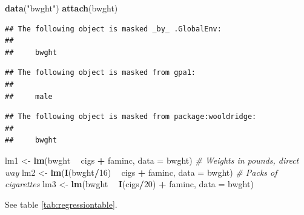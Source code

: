 \documentclass[]{book}
\newenvironment{Shaded}{\begin{snugshade}}{\end{snugshade}}
\newcommand{\CommentTok}[1]{\textcolor[rgb]{0.56,0.35,0.01}{\textit{#1}}}
\newcommand{\DataTypeTok}[1]{\textcolor[rgb]{0.13,0.29,0.53}{#1}}
\newcommand{\DecValTok}[1]{\textcolor[rgb]{0.00,0.00,0.81}{#1}}
\newcommand{\KeywordTok}[1]{\textcolor[rgb]{0.13,0.29,0.53}{\textbf{#1}}}
\newcommand{\NormalTok}[1]{#1}
\newcommand{\OperatorTok}[1]{\textcolor[rgb]{0.81,0.36,0.00}{\textbf{#1}}}
\newcommand{\StringTok}[1]{\textcolor[rgb]{0.31,0.60,0.02}{#1}}
\begin{document}
\begin{Shaded}
\begin{Highlighting}[]
\KeywordTok{data}\NormalTok{(}\StringTok{"bwght"}\NormalTok{)}
\KeywordTok{attach}\NormalTok{(bwght)}
\end{Highlighting}
\end{Shaded}

\begin{verbatim}
## The following object is masked _by_ .GlobalEnv:
## 
##     bwght
\end{verbatim}

\begin{verbatim}
## The following object is masked from gpa1:
## 
##     male
\end{verbatim}

\begin{verbatim}
## The following object is masked from package:wooldridge:
## 
##     bwght
\end{verbatim}

\begin{Shaded}
\begin{Highlighting}[]
\NormalTok{lm1 <-}\StringTok{ }\KeywordTok{lm}\NormalTok{(bwght }\OperatorTok{~}\StringTok{ }\NormalTok{cigs }\OperatorTok{+}\StringTok{ }\NormalTok{faminc, }\DataTypeTok{data =}\NormalTok{ bwght)}
\CommentTok{# Weights in pounds, direct way}
\NormalTok{lm2 <-}\StringTok{ }\KeywordTok{lm}\NormalTok{(}\KeywordTok{I}\NormalTok{(bwght}\OperatorTok{/}\DecValTok{16}\NormalTok{) }\OperatorTok{~}\StringTok{ }\NormalTok{cigs }\OperatorTok{+}\StringTok{ }\NormalTok{faminc, }\DataTypeTok{data =}\NormalTok{ bwght)}
\CommentTok{# Packs of cigarettes}
\NormalTok{lm3 <-}\StringTok{ }\KeywordTok{lm}\NormalTok{(bwght }\OperatorTok{~}\StringTok{ }\KeywordTok{I}\NormalTok{(cigs}\OperatorTok{/}\DecValTok{20}\NormalTok{) }\OperatorTok{+}\StringTok{ }\NormalTok{faminc, }\DataTypeTok{data =}\NormalTok{ bwght)}
\end{Highlighting}
\end{Shaded}

See table \ref{tab:regressiontable}.

\begin{Shaded}
\end{Shaded}
\end{document}
